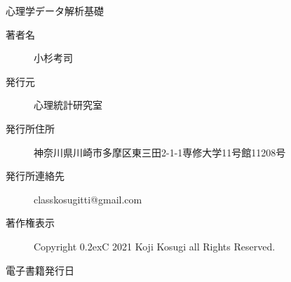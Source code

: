 \begin{center}
	\Large{心理学データ解析基礎}


	\vspace*{20pt}

	\large{}

	\large{}

	\vspace*{20pt}

	\begin{description}
		\item[著者名] 小杉考司
		\item[発行元] 心理統計研究室
		\item[発行所住所] 神奈川県川崎市多摩区東三田2-1-1専修大学11号館11208号
		\item[発行所連絡先] classkosugitti@gmail.com
		\item[著作権表示] Copyright \raise0.2ex\hbox{\textcircled{\scriptsize{C}}} 2021 Koji Kosugi all Rights Reserved.
		\item[電子書籍発行日] \date{\today}
	\end{description}
\end{center}
